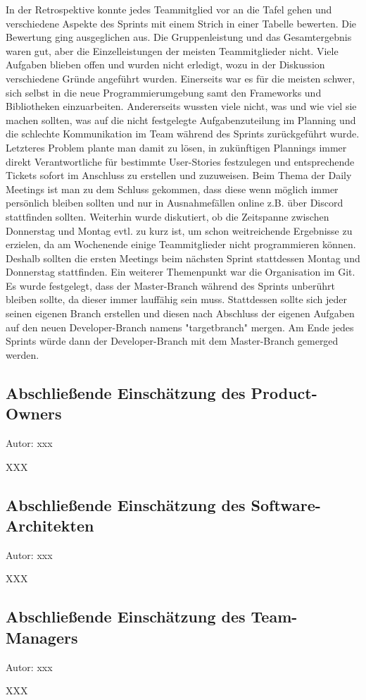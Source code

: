 In der Retrospektive konnte jedes Teammitglied vor an die Tafel gehen und verschiedene Aspekte des Sprints mit einem Strich in einer Tabelle bewerten.
Die Bewertung ging ausgeglichen aus. Die Gruppenleistung und das Gesamtergebnis waren gut, aber die Einzelleistungen der meisten Teammitglieder nicht. Viele Aufgaben blieben offen und wurden nicht erledigt, wozu in der Diskussion verschiedene Gründe angeführt wurden. Einerseits war es für die meisten schwer, sich selbst in die neue Programmierumgebung samt den Frameworks und Bibliotheken einzuarbeiten. Andererseits wussten viele nicht, was und wie viel sie machen sollten, was auf die nicht festgelegte Aufgabenzuteilung im Planning und die schlechte Kommunikation im Team während des Sprints zurückgeführt wurde. Letzteres Problem plante man damit zu lösen, in zukünftigen Plannings immer direkt Verantwortliche für bestimmte User-Stories festzulegen und entsprechende Tickets sofort im Anschluss zu erstellen und zuzuweisen.
Beim Thema der Daily Meetings ist man zu dem Schluss gekommen, dass diese wenn möglich immer persönlich bleiben sollten und nur in Ausnahmefällen online z.B. über Discord stattfinden sollten. Weiterhin wurde diskutiert, ob die Zeitspanne zwischen Donnerstag und Montag evtl. zu kurz ist, um schon weitreichende Ergebnisse zu erzielen, da am Wochenende einige Teammitglieder nicht programmieren können. Deshalb sollten die ersten Meetings beim nächsten Sprint stattdessen Montag und Donnerstag stattfinden.
Ein weiterer Themenpunkt war die Organisation im Git. Es wurde festgelegt, dass der Master-Branch während des Sprints unberührt bleiben sollte, da dieser immer lauffähig sein muss. Stattdessen sollte sich jeder seinen eigenen Branch erstellen und diesen nach Abschluss der eigenen Aufgaben auf den neuen Developer-Branch namens "targetbranch" mergen. Am Ende jedes Sprints würde dann der Developer-Branch mit dem Master-Branch gemerged werden.

\subsection{Abschließende Einschätzung des Product-Owners}
{\small Autor: xxx}

XXX

\subsection{Abschließende Einschätzung des Software-Architekten}
{\small Autor: xxx}

XXX

\subsection{Abschließende Einschätzung des Team-Managers}
{\small Autor: xxx}

XXX
